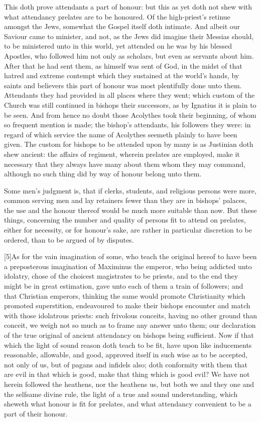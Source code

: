 This doth prove attendants a part of honour: but this as yet doth not shew with what attendancy prelates are to be honoured. Of the high-priest’s retinue amongst the Jews, somewhat the Gospel itself doth intimate. And albeit our Saviour came to minister, and not, as the Jews did imagine  their Messias should, to be ministered unto in this world, yet attended on he was by his blessed Apostles, who followed him not only as scholars, but even as servants about him. After that he had sent them, as himself was sent of God, in the midst of that hatred and extreme contempt which they sustained at the world’s hands, by saints and believers this part of honour was most plentifully done unto them. Attendants they had provided in all places where they went; which custom of the Church was still continued in bishops their successors, as by Ignatius it is plain to be seen. And from hence no doubt those Acolythes took their beginning, of whom so frequent mention is made; the bishop’s attendants, his followers they were: in regard of which service the name of Acolythes seemeth plainly to have been given. The custom for bishops to be attended upon by many is as Justinian doth shew ancient: the affairs of regiment, wherein prelates are employed, make it necessary that they always have many about them whom they may command, although no such thing did by way of honour belong unto them.

Some men’s judgment is, that if clerks, students, and religious persons were more, common serving men and lay retainers fewer than they are in bishops’ palaces, the use and the honour thereof would be much more suitable than now. But these things, concerning the number and quality of persons fit to attend on prelates, either for necessity, or for  honour’s sake, are rather in particular discretion to be ordered, than to be argued of by disputes.

[5]As for the vain imagination of some, who teach the original hereof to have been a preposterous imagination of Maximinus the emperor, who being addicted unto idolatry, chose of the choicest magistrates to be priests, and to the end they might be in great estimation, gave unto each of them a train of followers; and that Christian emperors, thinking the same would promote Christianity which promoted superstition, endeavoured to make their bishops encounter and match with those idolatrous priests: such frivolous conceits, having no other ground than conceit, we weigh not so much as to frame any answer unto them; our declaration of the true original of ancient attendancy on bishops being sufficient. Now if that which the light of sound reason doth teach to be fit, have upon like inducements reasonable, allowable, and good, approved itself in such wise as to be accepted, not only of us, but of pagans and infidels also; doth conformity with them that are evil in that which is good, make that thing which is good evil? We have not herein followed the heathens, nor the heathens us, but both we and they one and the selfsame divine rule, the light of a true and sound understanding,  which sheweth what honour is fit for prelates, and what attendancy convenient to be a part of their honour.

